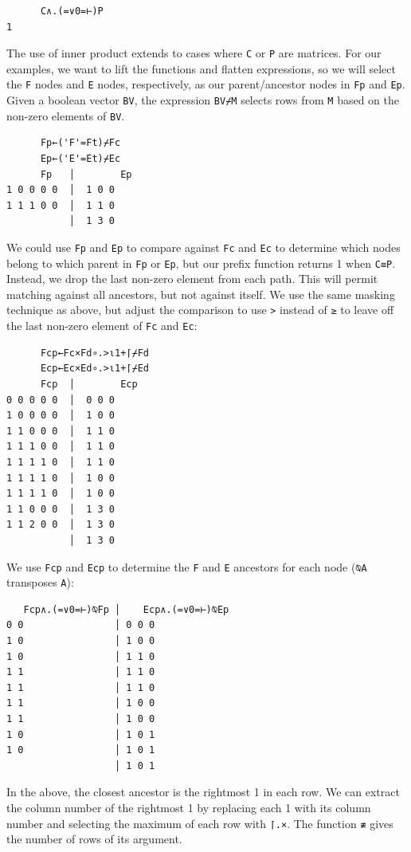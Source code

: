 ﻿\documentclass[numbers,10pt,preprint]{sigplanconf}
\begin{document}
\begin{verbatim}
      C∧.(=∨0=⊢)P
1
\end{verbatim}

The use of inner product extends to cases where \verb;C; or \verb;P; are matrices. For our examples, we want to lift the functions and flatten expressions, so we will select the \verb;F; nodes and \verb;E; nodes, respectively, as our parent/ancestor nodes in \verb;Fp; and \verb;Ep;. Given a boolean vector \verb;BV;, the expression \verb;BV⌿M; selects rows from \verb;M; based on the non-zero elements of \verb;BV;.

\begin{verbatim}
      Fp←('F'=Ft)⌿Fc
      Ep←('E'=Et)⌿Ec
      Fp   │        Ep
1 0 0 0 0  │  1 0 0
1 1 1 0 0  │  1 1 0
           │  1 3 0
\end{verbatim}

\noindent We could use \verb;Fp; and \verb;Ep; to compare against \verb;Fc; and \verb;Ec; to determine which nodes belong to which parent in \verb;Fp; or \verb;Ep;, but our prefix function returns 1 when \verb;C≡P;. Instead, we drop the last non-zero element from each path. This will permit matching against all ancestors, but not against itself. We use the same masking technique as above, but adjust the comparison to use \verb;>; instead of \verb;≥; to leave off the last non-zero element of \verb;Fc; and \verb;Ec;:

\begin{verbatim}
      Fcp←Fc×Fd∘.>⍳1+⌈⌿Fd
      Ecp←Ec×Ed∘.>⍳1+⌈⌿Ed
      Fcp  │        Ecp
0 0 0 0 0  │  0 0 0
1 0 0 0 0  │  1 0 0
1 1 0 0 0  │  1 1 0
1 1 1 0 0  │  1 1 0
1 1 1 1 0  │  1 1 0
1 1 1 1 0  │  1 0 0
1 1 1 1 0  │  1 0 0
1 1 0 0 0  │  1 3 0
1 1 2 0 0  │  1 3 0
           │  1 3 0
\end{verbatim}

\noindent We use \verb;Fcp; and \verb;Ecp; to determine the \verb;F; and \verb;E; ancestors for each node (\verb;⍉A; transposes \verb;A;):

\begin{verbatim}
   Fcp∧.(=∨0=⊢)⍉Fp │    Ecp∧.(=∨0=⊢)⍉Ep
0 0                │ 0 0 0
1 0                │ 1 0 0
1 0                │ 1 1 0
1 1                │ 1 1 0
1 1                │ 1 1 0
1 1                │ 1 0 0
1 1                │ 1 0 0
1 0                │ 1 0 1
1 0                │ 1 0 1
                   │ 1 0 1
\end{verbatim}

\noindent In the above, the closest ancestor is the rightmost 1 in each row. We can extract the column number of the rightmost 1 by replacing each 1 with its column number and selecting the maximum of each row with \verb;⌈.×;. The function \verb;≢; gives the number of rows of its argument.
\end{document}
